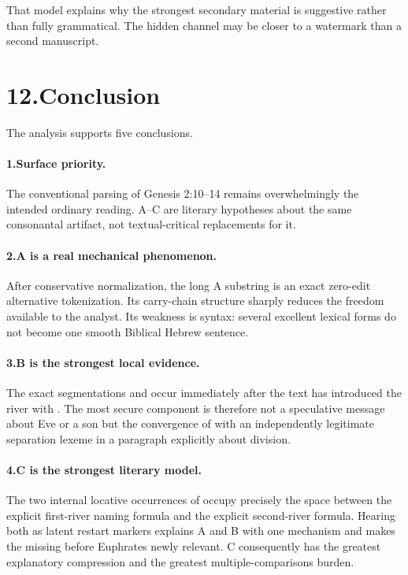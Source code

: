 That model explains why the strongest secondary material is suggestive rather than fully grammatical.  The hidden channel may be closer to a watermark than a second manuscript.

\section*{12.\quad Conclusion}

The analysis supports five conclusions.

\paragraph{1.\quad Surface priority.}
The conventional parsing of Genesis 2:10--14 remains overwhelmingly the intended ordinary reading.  A--C are literary hypotheses about the same consonantal artifact, not textual-critical replacements for it.

\paragraph{2.\quad A is a real mechanical phenomenon.}
After conservative normalization, the long A substring is an exact zero-edit alternative tokenization.  Its carry-chain structure sharply reduces the freedom available to the analyst.  Its weakness is syntax: several excellent lexical forms do not become one smooth Biblical Hebrew sentence.

\paragraph{3.\quad B is the strongest local evidence.}
The exact segmentations  and  occur immediately after the text has introduced the river with .  The most secure component is therefore not a speculative message about Eve or a son but the convergence of  with an independently legitimate separation lexeme in a paragraph explicitly about division.

\paragraph{4.\quad C is the strongest literary model.}
The two internal locative occurrences of  occupy precisely the space between the explicit first-river naming formula and the explicit second-river formula.  Hearing both as latent restart markers explains A and B with one mechanism and makes the missing  before Euphrates newly relevant.  C consequently has the greatest explanatory compression and the greatest multiple-comparisons burden.

